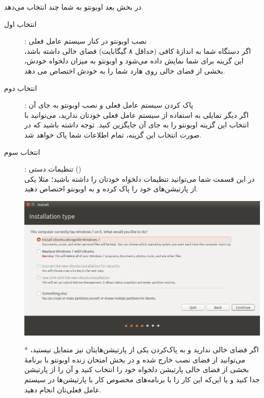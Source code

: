 در بخش بعد اوبونتو به شما چند انتخاب می‌دهد.
\begin{description}
\item[انتخاب اول]: نصب اوبونتو در کنار سیستم عامل فعلی\\
اگر دستگاه شما به اندازهٔ کافی (حداقل ۸ گیگابایت) فضای خالی داشته باشد، این گزینه برای شما نمایش داده می‌شود و اوبونتو به میزان دلخواه خودش، بخشی از فضای خالی روی هارد شما را به خودش اختصاص می دهد.

\item[انتخاب دوم]: پاک کردن سیستم عامل فعلی و نصب اوبونتو به جای آن\\
اگر دیگر تمایلی به استفاده از سیستم عامل فعلی خودتان ندارید، می‌توانید با انتخاب این گزینه اوبونتو را به جای آن جایگزین کنید. توجه داشته باشید که در صورت انتخاب این گزینه، تمام اطلاعات شما پاک خواهد شد.

\item[انتخاب سوم]: تنظیمات دستی ()\\
در این قسمت شما می‌توانید تنظیمات دلخواه خودتان را داشته باشید؛ مثلا یکی از پارتیشن‌های خود را پاک کرده و به اوبونتو اختصاص دهید.\\
\begin{center}
\includegraphics[scale=0.5]{pics/6.png}\\
\end{center}
* اگر فضای خالی ندارید و به پاک‌کردن یکی  از پارتیشن‌هایتان نیز متمایل نیستید، می‌توانید از فضای نصب خارج شده و در بخش امتحان زنده اوبونتو با برنامهٔ  بخشی از فضای خالی پارتیشن  دلخواه خود را انتخاب کنید و آن را از پارتیشن جدا کنید و یا این‌که این کار را با برنامه‌های مخصوص کار با پارتیشن‌ها در سیستم عامل فعلی‌تان انجام دهید.
\end{description}

